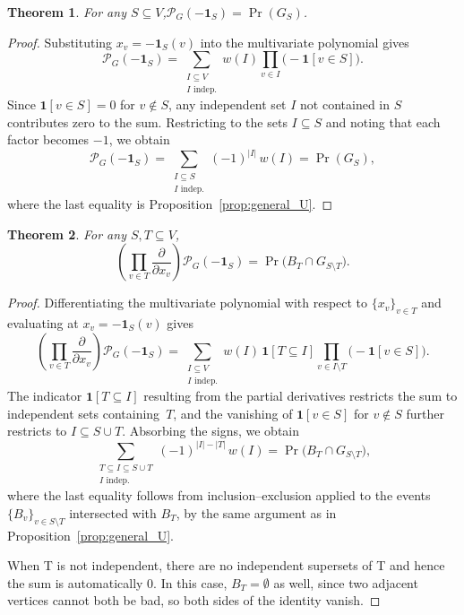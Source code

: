\documentclass[11pt,a4paper]{article}
\numberwithin{equation}{section}
\theoremstyle{plain}
\newtheorem{theorem}{Theorem}[section]
\theoremstyle{definition}
\theoremstyle{remark}
\begin{document}
\begin{theorem}
    For any $S \subseteq V$,\quad $\mathcal{P}_G(-\mathbf{1}_S) = \Pr(G_S)$.
\end{theorem}

\begin{proof}
    Substituting $x_v = -\mathbf{1}_S(v)$ into the multivariate polynomial gives
    \[
        \mathcal{P}_G(-\mathbf{1}_S)
        = \sum_{\substack{I \subseteq V \\ I \text{ indep.}}} w(I) \prod_{v \in I} \bigl(-\mathbf{1}[v \in S]\bigr).
    \]
    Since $\mathbf{1}[v \in S] = 0$ for $v \notin S$, any independent set $I$ not contained in $S$ contributes zero to the sum. Restricting to the sets $I \subseteq S$ and noting that each factor becomes $-1$, we obtain
    \[
        \mathcal{P}_G(-\mathbf{1}_S)
        = \sum_{\substack{I \subseteq S \\ I \text{ indep.}}} (-1)^{|I|}\, w(I)
        = \Pr(G_S),
    \]
    where the last equality is Proposition~\ref{prop:general_U}.
\end{proof}

\begin{theorem}
    For any $S, T \subseteq V$,
    \[
        \left(\prod_{v \in T} \frac{\partial}{\partial x_v}\right)
        \mathcal{P}_G(-\mathbf{1}_S)
        = \Pr\bigl(B_T \cap G_{S \setminus T}\bigr).
    \]
\end{theorem}

\begin{proof}
    Differentiating the multivariate polynomial with respect to
    $\{x_v\}_{v \in T}$ and evaluating at $x_v = -\mathbf{1}_S(v)$ gives
    \[
        \left(\prod_{v \in T} \frac{\partial}{\partial x_v}\right)
        \mathcal{P}_G(-\mathbf{1}_S)
        = 
        \sum_{\substack{I \subseteq V \\ I \text{ indep.}}}
        w(I)\,\mathbf{1}[T \subseteq I]
        \prod_{v \in I \setminus T} \bigl(-\mathbf{1}[v \in S]\bigr).
    \]
    The indicator $\mathbf{1}[T \subseteq I]$ resulting from 
    the partial derivatives restricts the sum to
    independent sets containing~$T$, and the vanishing of
    $\mathbf{1}[v \in S]$ for $v \notin S$ further restricts to
    $I \subseteq S \cup T$. Absorbing the signs, we obtain
    \[
        \sum_{\substack{T \subseteq I \subseteq S \cup T \\
        I \text{ indep.}}} (-1)^{|I| - |T|}\, w(I)
        = \Pr\bigl(B_T \cap G_{S \setminus T}\bigr),
    \]
    where the last equality follows from inclusion--exclusion
    applied to the events $\{B_v\}_{v \in S \setminus T}$
    intersected with $B_T$, by the same argument as in Proposition~\ref{prop:general_U}.

    When T is not independent, there are no independent supersets of T and hence the sum is automatically 0. In this case, $B_T=\emptyset$ as well, since two adjacent vertices cannot both be bad, so both sides of the identity vanish. 
\end{proof}
\end{document}
